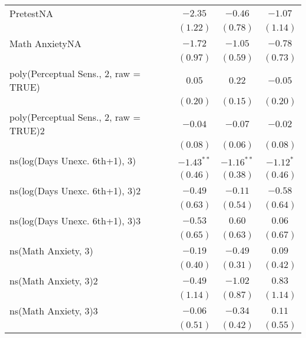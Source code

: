 \begin{center}
\begin{longtable}{l c c c}
PretestNA                           & $-2.35$      & $-0.46$      & $-1.07$      \\
                                                   & $(1.22)$     & $(0.78)$     & $(1.14)$     \\
Math AnxietyNA                            & $-1.72$      & $-1.05$      & $-0.78$      \\
                                                   & $(0.97)$     & $(0.59)$     & $(0.73)$     \\
poly(Perceptual Sens., 2, raw = TRUE)  & $0.05$       & $0.22$       & $-0.05$      \\
                                                   & $(0.20)$     & $(0.15)$     & $(0.20)$     \\
poly(Perceptual Sens., 2, raw = TRUE)2 & $-0.04$      & $-0.07$      & $-0.02$      \\
                                                   & $(0.08)$     & $(0.06)$     & $(0.08)$     \\
ns(log(Days Unexc. 6th+1), 3)                              & $-1.43^{**}$ & $-1.16^{**}$ & $-1.12^{*}$  \\
                                                   & $(0.46)$     & $(0.38)$     & $(0.46)$     \\
ns(log(Days Unexc. 6th+1), 3)2                             & $-0.49$      & $-0.11$      & $-0.58$      \\
                                                   & $(0.63)$     & $(0.54)$     & $(0.64)$     \\
ns(log(Days Unexc. 6th+1), 3)3                             & $-0.53$      & $0.60$       & $0.06$       \\
                                                   & $(0.65)$     & $(0.63)$     & $(0.67)$     \\
ns(Math Anxiety, 3)                       & $-0.19$      & $-0.49$      & $0.09$       \\
                                                   & $(0.40)$     & $(0.31)$     & $(0.42)$     \\
ns(Math Anxiety, 3)2                      & $-0.49$      & $-1.02$      & $0.83$       \\
                                                   & $(1.14)$     & $(0.87)$     & $(1.14)$     \\
ns(Math Anxiety, 3)3                      & $-0.06$      & $-0.34$      & $0.11$       \\
                                                   & $(0.51)$     & $(0.42)$     & $(0.55)$     \\

\end{longtable}
\end{center}
